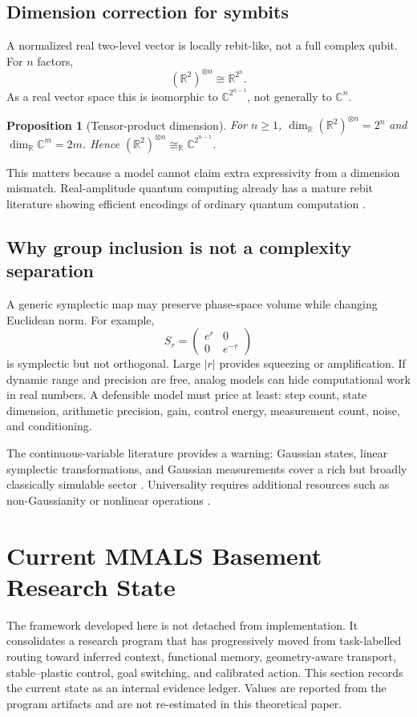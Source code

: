 \documentclass[11pt]{article}
\newtheorem{proposition}{Proposition}
\theoremstyle{definition}\newtheorem{definition}{Definition}\newtheorem{assumption}{Assumption}
\theoremstyle{remark}\newtheorem{remark}{Remark}
\newcommand{\R}{\mathbb{R}}\newcommand{\C}{\mathbb{C}}\newcommand{\E}{\mathbb{E}}
\begin{document}
\subsection{Dimension correction for symbits}
A normalized real two-level vector is locally rebit-like, not a full complex qubit. For $n$ factors,
\begin{equation}
(\R^2)^{\otimes n}\cong\R^{2^n}.
\end{equation}
As a real vector space this is isomorphic to $\C^{2^{n-1}}$, not generally to $\C^n$.
\begin{proposition}[Tensor-product dimension]
For $n\ge 1$, $\dim_{\R}(\R^2)^{\otimes n}=2^n$ and $\dim_{\R}\C^m=2m$. Hence $(\R^2)^{\otimes n}\cong_{\R}\C^{2^{n-1}}$.
\end{proposition}
This matters because a model cannot claim extra expressivity from a dimension mismatch. Real-amplitude quantum computing already has a mature rebit literature showing efficient encodings of ordinary quantum computation \cite{RudolphGrover2002}.

\subsection{Why group inclusion is not a complexity separation}
A generic symplectic map may preserve phase-space volume while changing Euclidean norm. For example,
\begin{equation}
S_r=\begin{pmatrix}e^r&0\\0&e^{-r}\end{pmatrix}
\end{equation}
is symplectic but not orthogonal. Large $|r|$ provides squeezing or amplification. If dynamic range and precision are free, analog models can hide computational work in real numbers. A defensible model must price at least: step count, state dimension, arithmetic precision, gain, control energy, measurement count, noise, and conditioning.

The continuous-variable literature provides a warning: Gaussian states, linear symplectic transformations, and Gaussian measurements cover a rich but broadly classically simulable sector \cite{BartlettEtAl2002,WeedbrookEtAl2012}. Universality requires additional resources such as non-Gaussianity or nonlinear operations \cite{LloydBraunstein1999,MenicucciEtAl2006,GKP2001}.

\section{Current MMALS Basement Research State}
The framework developed here is not detached from implementation. It consolidates a research program that has progressively moved from task-labelled routing toward inferred context, functional memory, geometry-aware transport, stable--plastic control, goal switching, and calibrated action. This section records the current state as an internal evidence ledger. Values are reported from the program artifacts and are not re-estimated in this theoretical paper.
\end{document}
